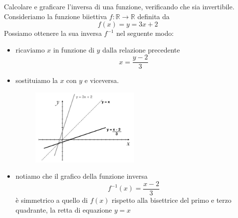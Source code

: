 \begin{esempio} Calcolare  e graficare l'inversa di una funzione, verificando 
che sia invertibile.\\ 
Consideriamo la funzione biiettiva $f:\mathbb{R}\to\mathbb{R}$ definita da
$$f(x)=y=3x+2$$
Possiamo ottenere la sua inversa $f^{-1}$ nel seguente modo:
  \begin{itemize}
  \item ricaviamo $x$ in funzione di $y$ dalla relazione 
precedente
$$x=\frac{y-2}{3}$$
  \item sostituiamo la $x$ con $y$ e viceversa.
  \begin{figure}[htpb!]
  \centering
  
\includegraphics[width=0.5\textwidth]{img/funz_13.png} 
  \end{figure}
  \item notiamo che il grafico della funzione inversa
$$f^{-1}(x)=\frac{x-2}{3}$$
è simmetrico a quello di $f(x)$ rispetto alla bisettrice del primo e terzo 
quadrante, la retta di equazione $y=x$
  \end{itemize}
\end{esempio}

